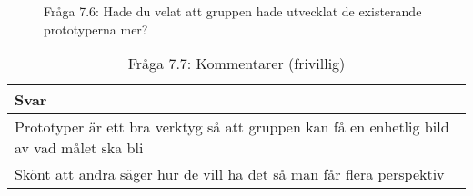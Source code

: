 \begin{figure}[H]
  \centering
  \caption{Fråga 7.6: Hade du velat att gruppen hade utvecklat de existerande prototyperna mer?}
\end{figure}

\begin{table}[h!]
  \caption{Fråga 7.7: Kommentarer (frivillig)}
  \def\arraystretch{1.5}
  \begin{adjustbox}{max width=\textwidth}
    \begin{tabularx}{\textwidth}{ | X |}
      \hline
      \textbf{Svar} \\
      \hline
      Prototyper är ett bra verktyg så att gruppen kan få en enhetlig bild av vad målet ska bli \\
      \hline
      Skönt att andra säger hur de vill ha det så man får flera perspektiv \\
      \hline  
    \end{tabularx}
  \end{adjustbox}
  \label{tab:prototyp_enkat_comments
}
\end{table}